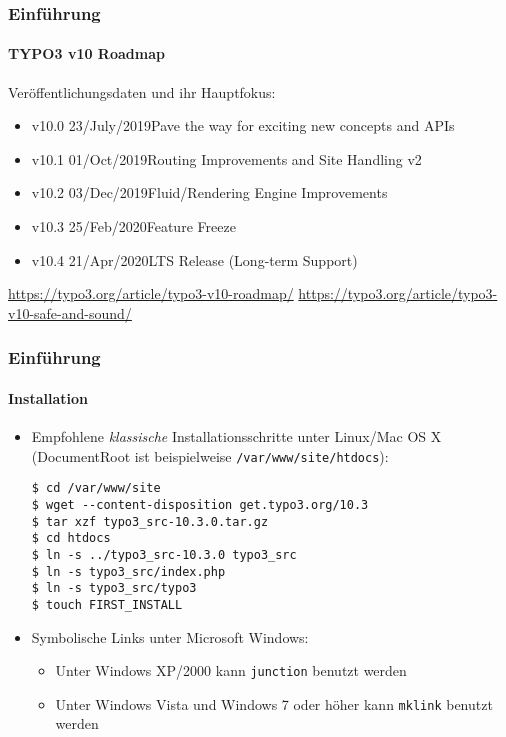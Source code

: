 
\begin{frame}[fragile]
	\frametitle{Einführung}
	\framesubtitle{TYPO3 v10 Roadmap}

	Veröffentlichungsdaten und ihr Hauptfokus:

	\begin{itemize}

		\item v10.0 \tabto{1.1cm}23/July/2019\tabto{3.4cm}Pave the way for exciting new concepts and APIs
		\item v10.1 \tabto{1.1cm}01/Oct/2019\tabto{3.4cm}Routing Improvements and Site Handling v2
		\item v10.2 \tabto{1.1cm}03/Dec/2019\tabto{3.4cm}Fluid/Rendering Engine Improvements
		\item
			\begingroup
				\color{typo3orange}
				v10.3 \tabto{1.1cm}25/Feb/2020\tabto{3.4cm}Feature Freeze
			\endgroup
		\item v10.4 \tabto{1.1cm}21/Apr/2020\tabto{3.4cm}LTS Release (Long-term Support)

	\end{itemize}

	\vspace{0.6cm}
	\smaller
		\url{https://typo3.org/article/typo3-v10-roadmap/}\newline
		\url{https://typo3.org/article/typo3-v10-safe-and-sound/}
	\normalsize

\end{frame}


\begin{frame}[fragile]
	\frametitle{Einführung}
	\framesubtitle{Installation}

	\begin{itemize}
		\item Empfohlene \textit{klassische} Installationsschritte unter Linux/Mac OS X\newline
			(DocumentRoot ist beispielweise \texttt{/var/www/site/htdocs}):
\begin{lstlisting}
$ cd /var/www/site
$ wget --content-disposition get.typo3.org/10.3
$ tar xzf typo3_src-10.3.0.tar.gz
$ cd htdocs
$ ln -s ../typo3_src-10.3.0 typo3_src
$ ln -s typo3_src/index.php
$ ln -s typo3_src/typo3
$ touch FIRST_INSTALL
\end{lstlisting}

		\item Symbolische Links unter Microsoft Windows:

			\begin{itemize}
				\item Unter Windows XP/2000 kann \texttt{junction} benutzt werden
				\item Unter Windows Vista und Windows 7 oder höher kann \texttt{mklink} benutzt werden
			\end{itemize}

	\end{itemize}
\end{frame}

